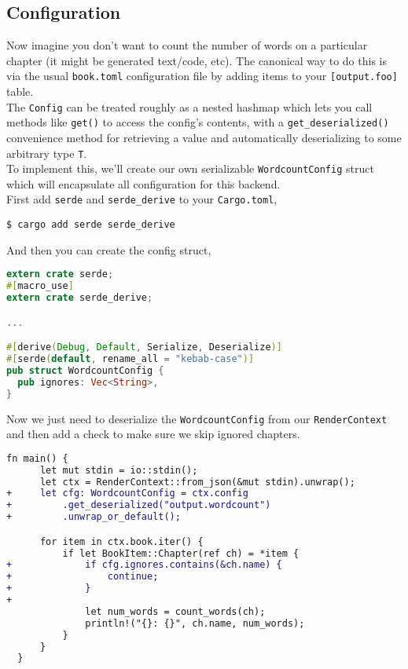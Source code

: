 \documentclass{article}
\begin{document}
\subsection{Configuration}
\label{Configuration}
\label{configuration}

Now imagine you don't want to count the number of words on a particular chapter
(it might be generated text/code, etc). The canonical way to do this is via the
usual \lstinline|book.toml| configuration file by adding items to your \lstinline|[output.foo]|
table.\\

The \lstinline|Config| can be treated roughly as a nested hashmap which lets you call
methods like \lstinline|get()| to access the config's contents, with a
\lstinline|get_deserialized()| convenience method for retrieving a value and automatically
deserializing to some arbitrary type \lstinline|T|.\\

To implement this, we'll create our own serializable \lstinline|WordcountConfig| struct
which will encapsulate all configuration for this backend.\\

First add \lstinline|serde| and \lstinline|serde_derive| to your \lstinline|Cargo.toml|,\\
\begin{lstlisting}
$ cargo add serde serde_derive

\end{lstlisting}

And then you can create the config struct,\\
\begin{lstlisting}[language=rust]
extern crate serde;
#[macro_use]
extern crate serde_derive;

...

#[derive(Debug, Default, Serialize, Deserialize)]
#[serde(default, rename_all = "kebab-case")]
pub struct WordcountConfig {
  pub ignores: Vec<String>,
}

\end{lstlisting}

Now we just need to deserialize the \lstinline|WordcountConfig| from our \lstinline|RenderContext|
and then add a check to make sure we skip ignored chapters.\\
\begin{lstlisting}[language=diff]
  fn main() {
      let mut stdin = io::stdin();
      let ctx = RenderContext::from_json(&mut stdin).unwrap();
+     let cfg: WordcountConfig = ctx.config
+         .get_deserialized("output.wordcount")
+         .unwrap_or_default();

      for item in ctx.book.iter() {
          if let BookItem::Chapter(ref ch) = *item {
+             if cfg.ignores.contains(&ch.name) {
+                 continue;
+             }
+
              let num_words = count_words(ch);
              println!("{}: {}", ch.name, num_words);
          }
      }
  }

\end{lstlisting}
\end{document}
